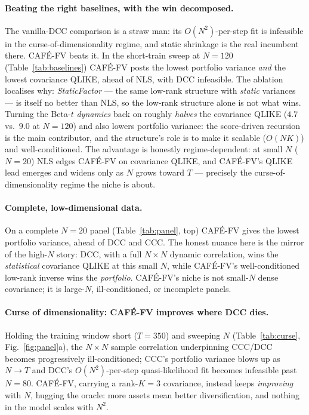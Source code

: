\documentclass[10pt,twocolumn]{article}
\newcommand{\cafe}{CAF\'E}
\newcommand{\fv}{\cafe{}-FV}
\begin{document}
\paragraph{Beating the right baselines, with the win decomposed.} The vanilla-DCC
comparison is a straw man: its $O(N^2)$-per-step fit is infeasible in the
curse-of-dimensionality regime, and static shrinkage is the real incumbent there. \fv{}
beats it. In the short-train sweep at $N=120$ (Table~\ref{tab:baselines}) \fv{} posts the
lowest portfolio variance \emph{and} the lowest covariance QLIKE, ahead of NLS, with DCC
infeasible. The ablation localises why: \emph{StaticFactor} --- the same low-rank structure
with \emph{static} variances --- is itself no better than NLS, so the low-rank structure
alone is not what wins. Turning the Beta-$t$ \emph{dynamics} back on roughly \emph{halves}
the covariance QLIKE ($4.7$ vs.\ $9.0$ at $N=120$) and also lowers portfolio variance: the
score-driven recursion is the main contributor, and the structure's role is to make it
scalable ($O(NK)$) and well-conditioned. The advantage is honestly regime-dependent: at
small $N$ ($N{=}20$) NLS edges \fv{} on covariance QLIKE, and \fv{}'s QLIKE lead emerges and
widens only as $N$ grows toward $T$ --- precisely the curse-of-dimensionality regime the
niche is about.



\paragraph{Complete, low-dimensional data.} On a complete $N=20$ panel
(Table~\ref{tab:panel}, top) \fv{} gives the lowest portfolio variance, ahead of DCC and
CCC. The honest nuance here is the mirror of the high-$N$ story: DCC, with a full $N\times
N$ dynamic correlation, wins the \emph{statistical} covariance QLIKE at this small $N$,
while \fv{}'s well-conditioned low-rank inverse wins the \emph{portfolio}. \fv{}'s niche is
not small-$N$ dense covariance; it is large-$N$, ill-conditioned, or incomplete panels.



\paragraph{Curse of dimensionality: \fv{} improves where DCC dies.} Holding the
training window short ($T=350$) and sweeping $N$ (Table~\ref{tab:curse},
Fig.~\ref{fig:panel}a), the $N\times N$ sample correlation underpinning CCC/DCC
becomes progressively ill-conditioned; CCC's portfolio variance blows up as $N\to T$ and
DCC's $O(N^2)$-per-step quasi-likelihood fit becomes infeasible past $N=80$. \fv{},
carrying a rank-$K=3$ covariance, instead keeps \emph{improving} with $N$, hugging the
oracle: more assets mean better diversification, and nothing in the model scales with
$N^2$.
\end{document}
